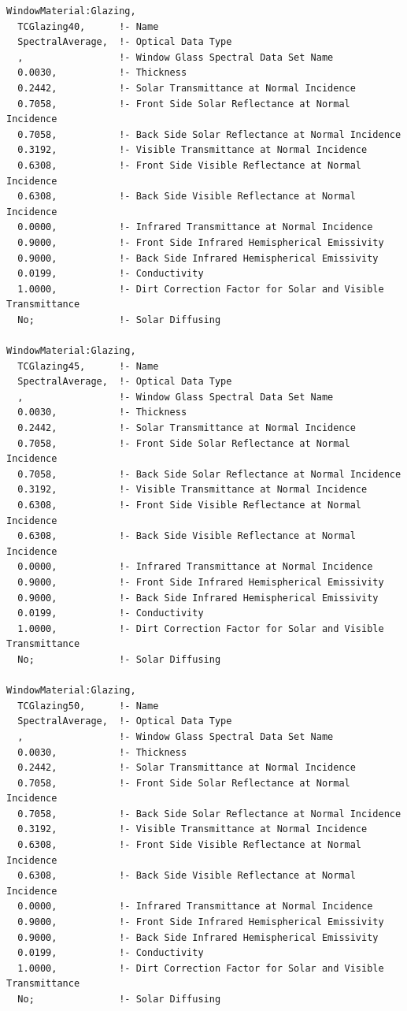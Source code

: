 \begin{lstlisting}
WindowMaterial:Glazing,
  TCGlazing40,      !- Name
  SpectralAverage,  !- Optical Data Type
  ,                 !- Window Glass Spectral Data Set Name
  0.0030,           !- Thickness
  0.2442,           !- Solar Transmittance at Normal Incidence
  0.7058,           !- Front Side Solar Reflectance at Normal Incidence
  0.7058,           !- Back Side Solar Reflectance at Normal Incidence
  0.3192,           !- Visible Transmittance at Normal Incidence
  0.6308,           !- Front Side Visible Reflectance at Normal Incidence
  0.6308,           !- Back Side Visible Reflectance at Normal Incidence
  0.0000,           !- Infrared Transmittance at Normal Incidence
  0.9000,           !- Front Side Infrared Hemispherical Emissivity
  0.9000,           !- Back Side Infrared Hemispherical Emissivity
  0.0199,           !- Conductivity
  1.0000,           !- Dirt Correction Factor for Solar and Visible Transmittance
  No;               !- Solar Diffusing

WindowMaterial:Glazing,
  TCGlazing45,      !- Name
  SpectralAverage,  !- Optical Data Type
  ,                 !- Window Glass Spectral Data Set Name
  0.0030,           !- Thickness
  0.2442,           !- Solar Transmittance at Normal Incidence
  0.7058,           !- Front Side Solar Reflectance at Normal Incidence
  0.7058,           !- Back Side Solar Reflectance at Normal Incidence
  0.3192,           !- Visible Transmittance at Normal Incidence
  0.6308,           !- Front Side Visible Reflectance at Normal Incidence
  0.6308,           !- Back Side Visible Reflectance at Normal Incidence
  0.0000,           !- Infrared Transmittance at Normal Incidence
  0.9000,           !- Front Side Infrared Hemispherical Emissivity
  0.9000,           !- Back Side Infrared Hemispherical Emissivity
  0.0199,           !- Conductivity
  1.0000,           !- Dirt Correction Factor for Solar and Visible Transmittance
  No;               !- Solar Diffusing

WindowMaterial:Glazing,
  TCGlazing50,      !- Name
  SpectralAverage,  !- Optical Data Type
  ,                 !- Window Glass Spectral Data Set Name
  0.0030,           !- Thickness
  0.2442,           !- Solar Transmittance at Normal Incidence
  0.7058,           !- Front Side Solar Reflectance at Normal Incidence
  0.7058,           !- Back Side Solar Reflectance at Normal Incidence
  0.3192,           !- Visible Transmittance at Normal Incidence
  0.6308,           !- Front Side Visible Reflectance at Normal Incidence
  0.6308,           !- Back Side Visible Reflectance at Normal Incidence
  0.0000,           !- Infrared Transmittance at Normal Incidence
  0.9000,           !- Front Side Infrared Hemispherical Emissivity
  0.9000,           !- Back Side Infrared Hemispherical Emissivity
  0.0199,           !- Conductivity
  1.0000,           !- Dirt Correction Factor for Solar and Visible Transmittance
  No;               !- Solar Diffusing


\end{lstlisting}
